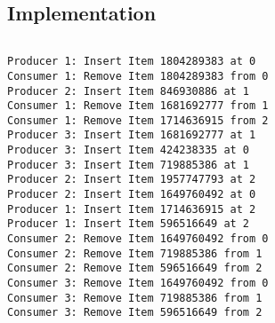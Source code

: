 \subsection{Implementation}

\inputminted[fontsize=\footnotesize,autogobble]{c}{code/producer_consumer.c}

\begin{lstlisting}[style=output]
Producer 1: Insert Item 1804289383 at 0
Consumer 1: Remove Item 1804289383 from 0
Producer 2: Insert Item 846930886 at 1
Consumer 1: Remove Item 1681692777 from 1
Consumer 1: Remove Item 1714636915 from 2
Producer 3: Insert Item 1681692777 at 1
Producer 3: Insert Item 424238335 at 0
Producer 3: Insert Item 719885386 at 1
Producer 2: Insert Item 1957747793 at 2
Producer 2: Insert Item 1649760492 at 0
Producer 1: Insert Item 1714636915 at 2
Producer 1: Insert Item 596516649 at 2
Consumer 2: Remove Item 1649760492 from 0
Consumer 2: Remove Item 719885386 from 1
Consumer 2: Remove Item 596516649 from 2
Consumer 3: Remove Item 1649760492 from 0
Consumer 3: Remove Item 719885386 from 1
Consumer 3: Remove Item 596516649 from 2
\end{lstlisting}